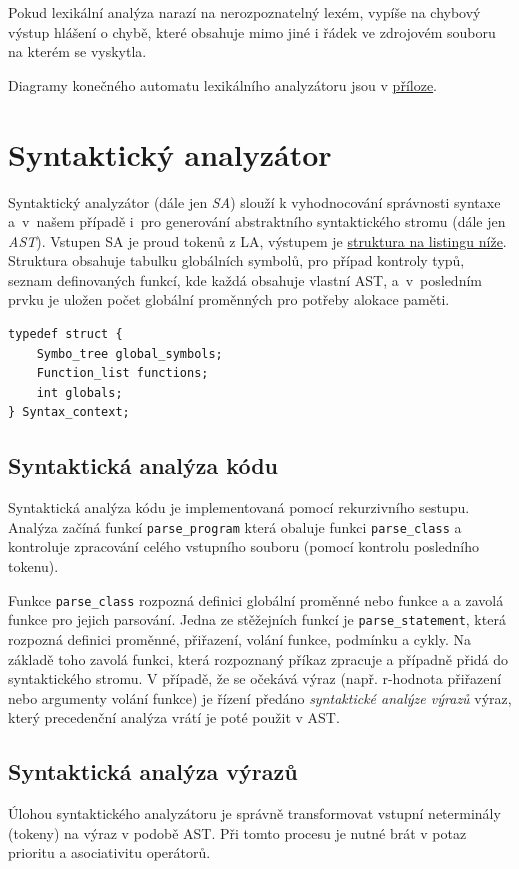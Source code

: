 \documentclass[a4paper,11pt]{article}
\begin{document}
Pokud lexikální analýza narazí na nerozpoznatelný lexém, vypíše na chybový výstup hlášení o chybě, které obsahuje mimo jiné i řádek ve zdrojovém souboru na kterém se vyskytla.

Diagramy konečného automatu lexikálního analyzátoru jsou v \hyperref[diag:LA-FSM]{příloze}.


\section{Syntaktický analyzátor}
Syntaktický analyzátor (dále jen \textit{SA}) slouží k vyhodnocování správnosti syntaxe a~v~našem případě i~pro generování abstraktního syntaktického stromu (dále jen \textit{AST}). Vstupen SA je proud tokenů z LA, výstupem je \hyperref[lst:saOut]{struktura na listingu níže}. Struktura obsahuje tabulku globálních symbolů, pro případ kontroly typů, seznam definovaných funkcí, kde každá obsahuje vlastní AST, a~v~posledním prvku je uložen počet globální proměnných pro potřeby alokace paměti.

\begin{lstlisting}[caption={Výstupní struktura SA}, label={lst:saOut}]
typedef struct {
	Symbo_tree global_symbols;
	Function_list functions;
	int globals;
} Syntax_context;
\end{lstlisting}

\subsection{Syntaktická analýza kódu}
Syntaktická analýza kódu je implementovaná pomocí rekurzivního sestupu. Analýza začíná funkcí \texttt{parse\_program} která obaluje funkci \texttt{parse\_class} a kontroluje zpracování celého vstupního souboru (pomocí kontrolu posledního tokenu).

Funkce \texttt{parse\_class} rozpozná definici globální proměnné nebo funkce a a zavolá funkce pro jejich parsování. Jedna ze stěžejních funkcí je \texttt{parse\_statement}, která rozpozná definici proměnné, přiřazení, volání funkce, podmínku a cykly. Na základě toho zavolá funkci, která rozpoznaný příkaz zpracuje a případně přidá do syntaktického stromu. V případě, že se očekává výraz (např. r-hodnota přiřazení nebo argumenty volání funkce) je řízení předáno \emph{syntaktické analýze výrazů} výraz, který precedenční analýza vrátí je poté použit v AST.

\subsection{Syntaktická analýza výrazů}
Úlohou syntaktického analyzátoru je správně transformovat vstupní neterminály (tokeny) na výraz v podobě AST. Při tomto procesu je nutné brát v potaz prioritu a asociativitu operátorů.
\end{document}
